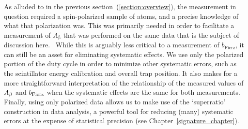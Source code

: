 % 
As alluded to in the previous section~(\ref{section:overview}), the measurement in question required a spin-polarized sample of atoms, and a precise knowledge of what that polarization was.  This was primarily needed in order to facilitate a measurement of $A_{\mathrm{\beta}}$ 
that was performed on the same data that is the subject of discussion here.~\cite{ben_Abeta}   
While this is arguably less critical to a measurement of $b_{\mathrm{Fierz}}$,
it can still be an asset for eliminating systematic effects.    
We use only the polarized portion of the duty cycle in order to minimize other systematic errors, such as the scintillator energy calibration and overall trap position.  It also makes for a more straightforward interpretation of the relationship of the measured values of $A_{\beta}$ and $b_{\mathrm{Fierz}}$ when the systematic effects are the same for both measurements. Finally, using only polarized data allows us to make use of the `superratio' construction in data analysis, a powerful tool for reducing (many) systematic errors at the expense of statistical precision (see Chapter~\ref{signature_chapter}).
% 
%
%


